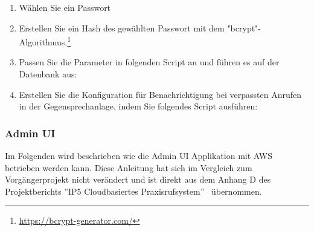 \begin{enumerate}
\begin{enumerate}
        \item Wählen Sie ein Passwort
        \item Erstellen Sie ein Hash des gewählten Passwort mit dem "bcrypt"-Algorithmus.\footnote{\url{https://bcrypt-generator.com/}}
        \item Passen Sie die Parameter in folgenden Script an und führen es auf der Datenbank aus:
        
        \item Erstellen Sie die Konfiguration für Benachrichtigung bei verpassten Anrufen in der Gegensprechanlage, indem Sie folgendes Script ausführen:
        
    \end{enumerate}

\end{enumerate}

\subsubsection*{Admin UI}

Im Folgenden wird beschrieben wie die Admin UI Applikation mit AWS betrieben werden kann.
Diese Anleitung hat sich im Vergleich zum Vorgängerprojekt nicht verändert und ist direkt aus dem Anhang D des Projektberichts ''IP5 Cloudbasiertes Praxisrufsystem''~\cite{ip5} übernommen.

